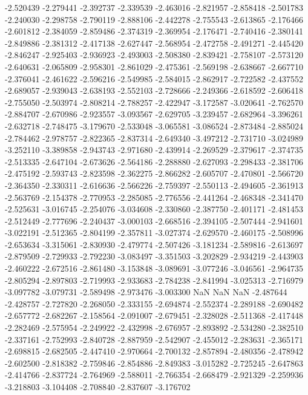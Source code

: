-2.520439
-2.279441
-2.392737
-2.339539
-2.463016
-2.821957
-2.858418
-2.501783
-2.240030
-2.298758
-2.790119
-2.888106
-2.442278
-2.755543
-2.613865
-2.176466
-2.601812
-2.384059
-2.859486
-2.374319
-2.369954
-2.176471
-2.740416
-2.380141
-2.849886
-2.381312
-2.417138
-2.627447
-2.568954
-2.472758
-2.491271
-2.445420
-2.846247
-2.925403
-2.936923
-2.493003
-2.508380
-2.839421
-2.758107
-2.573120
-2.640631
-2.065809
-2.958301
-2.861029
-2.475361
-2.569198
-2.638667
-2.667710
-2.376041
-2.461622
-2.596216
-2.549985
-2.584015
-2.862917
-2.722582
-2.437552
-2.689057
-2.939043
-2.638193
-2.552103
-2.728666
-2.249366
-2.618592
-2.606418
-2.755050
-2.503974
-2.808214
-2.788257
-2.422947
-3.172587
-3.020641
-2.762570
-2.884707
-2.670986
-2.923557
-3.093567
-2.629705
-3.239457
-2.682964
-3.396261
-2.632718
-2.748475
-3.179670
-2.533048
-3.065581
-3.086524
-2.873484
-2.885024
-2.784462
-2.978757
-2.822365
-2.837314
-2.649340
-3.497212
-2.731710
-3.024989
-3.252110
-3.389858
-2.943743
-2.971680
-2.439914
-2.269529
-2.379617
-2.374735
-2.513335
-2.647104
-2.673626
-2.564186
-2.288880
-2.627093
-2.298433
-2.381706
-2.475192
-2.593743
-2.823598
-2.362275
-2.866282
-2.605707
-2.470801
-2.566720
-2.364350
-2.330311
-2.616636
-2.566226
-2.759397
-2.550113
-2.494605
-2.361913
-2.563769
-2.154378
-2.770953
-2.285085
-2.776556
-2.441264
-2.468348
-2.341470
-2.525631
-3.016745
-2.254076
-3.034608
-2.330860
-2.387750
-2.401171
-2.481453
-2.512449
-2.777696
-2.240437
-3.000103
-2.668516
-2.394105
-2.507444
-2.941601
-3.022191
-2.512365
-2.804199
-2.357811
-3.027374
-2.629570
-2.460175
-2.508996
-2.653634
-3.315061
-2.830930
-2.479774
-2.507426
-3.181234
-2.589816
-2.613697
-2.879509
-2.729933
-2.792230
-3.083497
-3.351503
-3.202829
-2.934219
-2.443903
-2.460222
-2.672516
-2.861480
-3.153848
-3.089691
-3.077246
-3.046561
-2.964735
-2.805294
-2.897803
-2.719993
-2.933683
-2.784238
-2.841994
-3.025313
-2.716979
-3.097782
-3.079731
-2.589498
-2.973476
-3.003300
NaN
NaN
NaN
-2.487644
-2.428757
-2.727820
-2.268050
-2.333155
-2.694874
-2.552374
-2.289188
-2.690482
-2.657772
-2.682267
-2.158564
-2.091007
-2.679451
-2.328028
-2.511368
-2.417448
-2.282469
-2.575954
-2.249922
-2.432998
-2.676957
-2.893892
-2.534280
-2.382510
-2.337161
-2.752993
-2.840728
-2.887959
-2.542907
-2.455012
-2.283631
-2.365171
-2.698815
-2.682505
-2.447410
-2.970664
-2.700132
-2.857894
-2.480356
-2.478942
-2.602500
-2.818382
-2.759846
-2.854886
-2.849383
-3.015282
-2.725245
-2.647863
-2.414766
-2.837724
-2.764969
-2.588011
-2.766354
-2.668479
-2.921329
-2.259936
-3.218803
-3.104408
-2.708840
-2.837607
-3.176702
